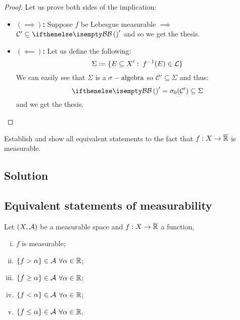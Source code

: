 \begin{proof}
    Let us prove both sides of the implication:
    \begin{itemize}
        \item \textbf{$(\implies)$:} Suppose $f$ be Lebesgue measurable $\implies$ $\mathcal{C}'\subseteq \B'$ and so we get the thesis.
        \item \textbf{$(\impliedby)$:} Let us define the following:
              \[
                  \Sigma \coloneqq \{ E\subseteq X': \; f^{-1}(E)\in\mathcal{L} \}
              \]
              We can easily see that $\Sigma$ is a $\sigma-\text{algebra}$ so $\mathcal{C}'\subseteq \Sigma$ and thus:
              \[
                  \B'=\sigma_0(\mathcal{C}')\subseteq\Sigma
              \]
              and we get the thesis.
    \end{itemize}
\end{proof}


\question

Establish and show all equivalent statements to the fact that $f : X \to \overline{\mathbb{R}}$ is measurable.

\subsection*{Solution}

\subsection{Equivalent statements of measurability}
Let $(X,\mathcal{A})$ be a measurable space and $f:X\to\overline{\mathbb{R}}$ a function, \tfae

\begin{enumerate}[i)]
    \item \label{statomeas:1} $f$ is measurable;
    \item \label{statomeas:2} $\{ f>\alpha \}\in\mathcal{A}$ $\forall\alpha\in\mathbb{R}$;
    \item \label{statomeas:3} $\{ f\geq\alpha \}\in\mathcal{A}$ $\forall\alpha\in\mathbb{R}$;
    \item \label{statomeas:4} $\{ f<\alpha \}\in\mathcal{A}$ $\forall\alpha\in\mathbb{R}$;
    \item \label{statomeas:5} $\{ f\leq\alpha \}\in\mathcal{A}$ $\forall\alpha\in\mathbb{R}$.
\end{enumerate}

